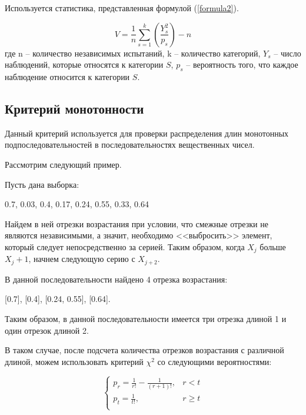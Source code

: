Используется статистика, представленная формулой (\ref{formula2}).

\begin{equation}\label{formula2}
	V = \frac{1}{n}\sum_{s=1}^{k} \left( \frac{Y_s^2}{p_s} \right) - n
\end{equation}
где n -- количество независимых испытаний, k -- количество категорий, $Y_s$ -- число наблюдений, которые относятся к категории $S$, $p_s$ -- вероятность того, что каждое наблюдение относится к категории $S$.

\subsection{Критерий монотонности}

Данный критерий используется для проверки распределения длин монотонных
подпоследовательностей в последовательностях вещественных чисел.

Рассмотрим следующий пример. 

Пусть дана выборка:

0.7, 0.03, 0.4, 0.17, 0.24, 0.55, 0.33, 0.64

Найдем в ней отрезки возрастания при условии, что смежные отрезки не являются независимыми, а значит, необходимо <<выбросить>> элемент, который следует непосредственно за серией. Таким образом,
когда $ X_j $ больше $ X_j+1 $, начнем следующую серию с $ X_{j+2} $.

В данной последовательности найдено 4 отрезка возрастания:

[0.7], [0.4], [0.24, 0.55], [0.64].

Таким образом, в данной последовательности имеется три отрезка длиной 1 и один отрезок длиной 2.

В таком случае, после подсчета количества отрезков возрастания с
различной длиной, можем использовать критерий $\chi^2$ со следующими вероятностями:

\begin{equation}\label{formula3}
	\begin{cases}
		p_r = \frac {1}{r!} - \frac {1}{(r+1)!}, & r < t\\
		p_t = \frac {1}{t!}, & r \geq t\\
	\end{cases}
\end{equation}


